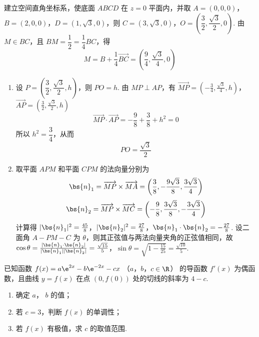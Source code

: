 \begin{solution}
建立空间直角坐标系，使底面 \(ABCD\) 在 \(z=0\) 平面内，并取
\(A=(0,0,0)\)，\(B=(2,0,0)\)，\(D=(1,\sqrt{3},0)\)，则
\(C=(3,\sqrt{3},0)\)，\(O=\left(\dfrac{3}{2},\dfrac{\sqrt{3}}{2},0\right)\).
由 \(M\in BC\)，且 \(BM=\dfrac{1}{2}=\dfrac{1}{4}BC\)，得
\[
M=B+\frac{1}{4}\overrightarrow{BC}
 =\left(\frac{9}{4},\frac{\sqrt{3}}{4},0\right)
\]

\begin{enumerate}
\item 设 \(P=\left(\dfrac{3}{2},\dfrac{\sqrt{3}}{2},h\right)\)，则 \(PO=h\). 由 \(MP\perp AP\)，有
\(\overrightarrow{MP}=\left(-\frac{3}{4},\frac{\sqrt{3}}{4},h\right)\)，\(\overrightarrow{AP}=\left(\frac{3}{2},\frac{\sqrt{3}}{2},h\right)\)
\[
\overrightarrow{MP}\cdot\overrightarrow{AP}
 =-\frac{9}{8}+\frac{3}{8}+h^2=0
\]
所以 \(h^2=\dfrac{3}{4}\)，从而
\[
PO=\frac{\sqrt{3}}{2}
\]

\item 取平面 \(APM\) 和平面 \(CPM\) 的法向量分别为
\[
\bs{n}_1=\overrightarrow{MP}\times\overrightarrow{MA}
 =\left(\frac{3}{8},-\frac{9\sqrt{3}}{8},\frac{3\sqrt{3}}{4}\right)
\]
\[
\bs{n}_2=\overrightarrow{MP}\times\overrightarrow{MC}
 =\left(-\frac{9}{8},\frac{3\sqrt{3}}{8},-\frac{3\sqrt{3}}{4}\right)
\]
计算得
\(|\bs{n}_1|^2=\frac{45}{8}\)，\(|\bs{n}_2|^2=\frac{27}{8}\)，\(\bs{n}_1\cdot\bs{n}_2=-\frac{27}{8}\).
设二面角 \(A-PM-C\) 为 \(\theta\)，则其正弦值与两法向量夹角的正弦值相同，故
\(\cos\theta=\frac{|\bs{n}_1\cdot\bs{n}_2|}{|\bs{n}_1||\bs{n}_2|} =\frac{\sqrt{15}}{5}\)，\(\sin\theta=\sqrt{1-\frac{15}{25}}=\frac{\sqrt{10}}{5}\).
\end{enumerate}
\end{solution}

\begin{problem}
已知函数 \( f(x) = a\e^{2x} - b\e^{-2x} - cx \) （\(a\)，\(b\)，\(c \in \R\)） 的导函数 \( f'(x) \) 为偶函数，且曲线 \( y = f(x) \) 在点 \(\left(0, f(0)\right)\) 处的切线的斜率为 \(4-c\).

\begin{enumerate}
\item 确定 \(a\)， \(b\) 的值；
\item 若 \(c = 3\)，判断 \( f(x) \) 的单调性；
\item 若 \( f(x) \) 有极值，求 \(c\) 的取值范围.
\end{enumerate}
\end{problem}

